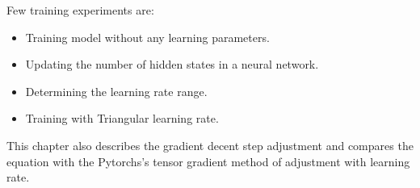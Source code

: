 Few training experiments are:
\begin{itemize}
    \item Training model without any learning parameters.
    \item Updating the number of hidden states in a neural network.
    \item Determining the learning rate range.
    \item Training with Triangular learning rate.
\end{itemize}


This chapter also describes the gradient decent \parencite{cauchy} step adjustment and compares the equation with the Pytorchs's tensor gradient method of adjustment with learning rate.  